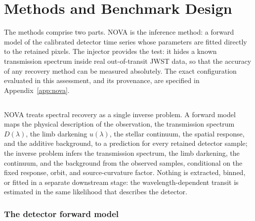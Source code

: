 \section{Methods and Benchmark Design}
\label{sec:methods}


The methods comprise two parts. NOVA is the inference method: a forward
model of the calibrated detector time series whose parameters are fitted
directly to the retained pixels. The injector provides the test: it hides
a known transmission spectrum inside real out-of-transit JWST data, so
that the accuracy of any recovery method can be measured absolutely. The
exact configuration evaluated in this assessment, and its provenance, are
specified in Appendix~\ref{app:nova}.

\subsection{\nova{}}


NOVA treats spectral recovery as a single inverse problem. A forward
model maps the physical description of the observation, the transmission
spectrum $D(\lambda)$, the limb darkening $u(\lambda)$, the stellar
continuum, the spatial response, and the additive background, to a
prediction for every retained detector sample; the inverse problem infers
the transmission spectrum, the limb darkening, the continuum, and the
background from the observed samples, conditional on the fixed response,
orbit, and source-curvature factor. Nothing is extracted, binned,
or fitted in a separate downstream stage: the wavelength-dependent
transit is estimated in the same likelihood that describes the detector.

\subsubsection{The detector forward model}

